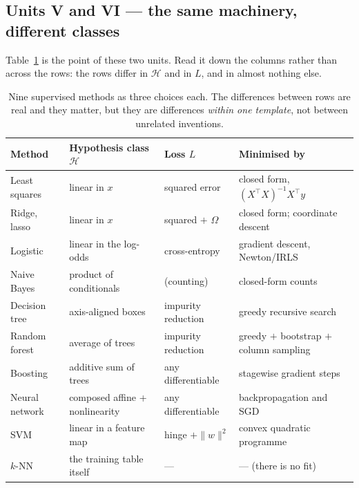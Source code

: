 \documentclass[11pt]{article}
\begin{document}
\subsection{Units V and VI --- the same machinery, different classes}

Table~\ref{tab:zootab} is the point of these two units. Read it down the
columns rather than across the rows: the rows differ in $\mathcal{H}$ and in
$L$, and in almost nothing else.

\begin{table}[t]
  \centering \small
  \begin{tabular}{@{}llll@{}}
    \toprule
    \textbf{Method} & \textbf{Hypothesis class $\mathcal{H}$} &
      \textbf{Loss $L$} & \textbf{Minimised by} \\
    \midrule
    Least squares  & linear in $x$           & squared error       & closed form, $(X^\top X)^{-1}X^\top y$ \\
    Ridge, lasso   & linear in $x$           & squared $+$ $\Omega$ & closed form; coordinate descent \\
    Logistic       & linear in the log-odds  & cross-entropy       & gradient descent, Newton/IRLS \\
    Naive Bayes    & product of conditionals & (counting)          & closed-form counts \\
    Decision tree  & axis-aligned boxes      & impurity reduction  & greedy recursive search \\
    Random forest  & average of trees        & impurity reduction  & greedy $+$ bootstrap $+$ column sampling \\
    Boosting       & additive sum of trees   & any differentiable  & stagewise gradient steps \\
    Neural network & composed affine + nonlinearity & any differentiable & backpropagation and SGD \\
    SVM            & linear in a feature map & hinge $+ \lVert w \rVert^2$ & convex quadratic programme \\
    $k$-NN         & the training table itself & ---               & --- (there is no fit) \\
    \bottomrule
  \end{tabular}
  \caption{Nine supervised methods as three choices each. The differences
  between rows are real and they matter, but they are differences
  \emph{within one template}, not between unrelated inventions.}
  \label{tab:zootab}
\end{table}
\end{document}
